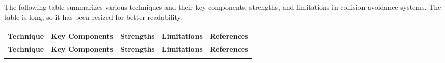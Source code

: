 \documentclass[12pt,twocolumn]{article}
\begin{document}
The following table summarizes various techniques and their key components, strengths, and limitations in collision avoidance systems. The table is long, so it has been resized for better readability.
\onecolumn
\begin{longtable}{|p{3cm}|p{4cm}|p{3cm}|p{3cm}|p{3cm}|} %
\hline
\textbf{Technique} & \textbf{Key Components} & \textbf{Strengths} & \textbf{Limitations} & \textbf{References} \\ \hline
\endfirsthead %
\hline
\textbf{Technique} & \textbf{Key Components} & \textbf{Strengths} & \textbf{Limitations} & \textbf{References} \\ \hline
\endhead %
\hline
\endfoot %
\hline
\endlastfoot %


\end{longtable}
\end{document}
